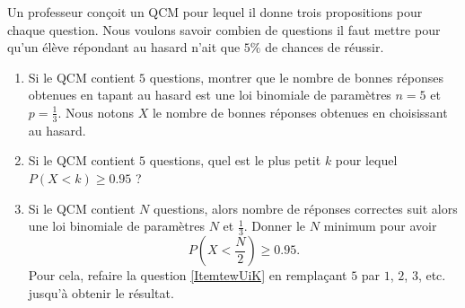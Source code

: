 
\begin{exercice}\label{exoPremiere-0092}

    Un professeur conçoit un QCM pour lequel il donne trois propositions pour chaque question. Nous voulons savoir combien de questions il faut mettre pour qu'un élève répondant au hasard n'ait que \( 5\%\) de chances de réussir.

    \begin{enumerate}
        \item
            Si le QCM contient \( 5\) questions, montrer que le nombre de bonnes réponses obtenues en tapant au hasard est une loi binomiale de paramètres \( n=5\) et \( p=\frac{1}{ 3 }\). Nous notons \( X\) le nombre de bonnes réponses obtenues en choisissant au hasard.
        \item   \label{ItemtewUiK}
            Si le QCM contient \( 5\) questions, quel est le plus petit \( k\) pour lequel \( P(X<k)\geq 0.95\) ?
        \item
            Si le QCM contient \( N\) questions, alors nombre de réponses correctes suit alors une loi binomiale de paramètres \( N\) et \( \frac{1}{ 3 }\). Donner le \( N\) minimum pour avoir 
            \begin{equation}
                P(X<\frac{ N }{ 2 })\geq 0.95.
            \end{equation}
            Pour cela, refaire la question \ref{ItemtewUiK} en remplaçant \( 5\) par \( 1\), \( 2\), \( 3\), etc. jusqu'à obtenir le résultat.
    \end{enumerate}

\end{exercice}

